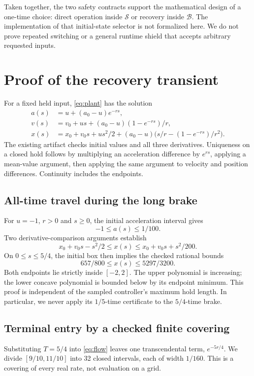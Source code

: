 \documentclass[10pt]{article}
\begin{document}
Taken together, the two safety contracts support the mathematical design of a one-time choice: direct operation inside $\mathcal S$ or recovery inside $\mathcal B$. The implementation of that initial-state selector is not formalized here. We do not prove repeated switching or a general runtime shield that accepts arbitrary requested inputs.

\section{Proof of the recovery transient}
For a fixed held input, \eqref{eq:plant} has the solution
\begin{align}
a(s)&=u+(a_0-u)e^{-rs},\nonumber\\
v(s)&=v_0+us+(a_0-u)(1-e^{-rs})/r,\label{eq:flow}\\
x(s)&=x_0+v_0s+us^2/2+
(a_0-u)\bigl(s/r-(1-e^{-rs})/r^2\bigr).\nonumber
\end{align}
The existing artifact checks initial values and all three derivatives. Uniqueness on a closed hold follows by multiplying an acceleration difference by $e^{rs}$, applying a mean-value argument, then applying the same argument to velocity and position differences. Continuity includes the endpoints.

\subsection{All-time travel during the long brake}
For $u=-1$, $r>0$ and $s\ge0$, the initial acceleration interval gives
\[
-1\le a(s)\le1/100.
\]
Two derivative-comparison arguments establish
\[
x_0+v_0s-s^2/2\le x(s)
\le x_0+v_0s+s^2/200.
\]
On $0\le s\le5/4$, the initial box then implies the checked rational bounds
\begin{equation}\label{eq:path}
657/800\le x(s)\le5297/3200.
\end{equation}
Both endpoints lie strictly inside $[-2,2]$. The upper polynomial is increasing; the lower concave polynomial is bounded below by its endpoint minimum. This proof is independent of the sampled controller's maximum hold length. In particular, we never apply its $1/5$-time certificate to the $5/4$-time brake.

\subsection{Terminal entry by a checked finite covering}
Substituting $T=5/4$ into \eqref{eq:flow} leaves one transcendental term, $e^{-5r/4}$. We divide $[9/10,11/10]$ into 32 closed intervals, each of width $1/160$. This is a covering of every real rate, not evaluation on a grid.
\end{document}
